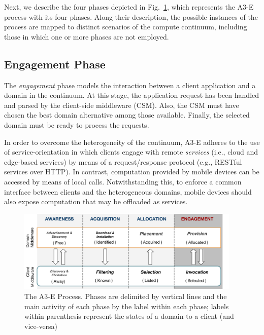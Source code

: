 
Next, we describe the four phases depicted in Fig.~\ref{fig:A3-E-process}, which represents the A3-E process with its four phases. Along their description, the possible instances of the process are mapped to distinct scenarios of the compute continuum, including those in which one or more phases are not employed.



\subsection{Engagement Phase}\label{sec:A3-E-engagement}

The \textit{engagement} phase models the interaction between a client application and a domain in the continuum. At this stage, the application request has been handled and parsed by the client-side middleware (CSM). Also, the CSM must have chosen the best domain alternative among those available. Finally, the selected domain must be ready to process the requests.

In order to overcome the heterogeneity of the continuum, A3-E adheres to the use of service-orientation in which clients engage with remote \textit{services} (i.e., cloud and edge-based services) by means of a request/response protocol (e.g., RESTful services over HTTP). In contrast, computation provided by mobile devices can be accessed by means of local calls. Notwithstanding this, to enforce a common interface between clients and the heterogeneous domains, mobile devices should also expose computation that may be offloaded as services. 

\begin{figure}[tbp]
	\includegraphics[width=0.95\textwidth]{figs/A3-E-process}
	\caption{The A3-E Process. Phases are delimited by vertical lines and the main activity of each phase by the label within each phase; labels within parenthesis represent the states of a domain to a client (and vice-versa)}
	\label{fig:A3-E-process}
\end{figure}

